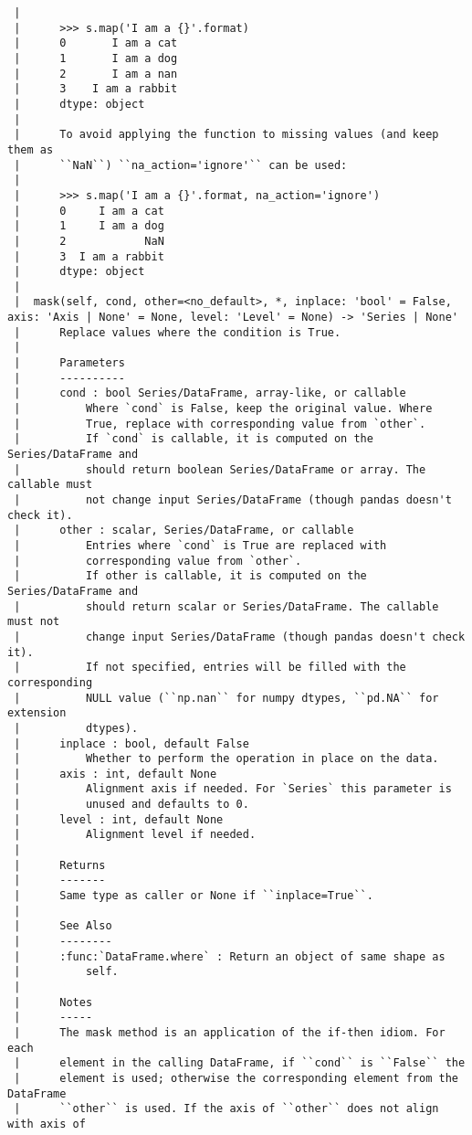 \documentclass[
  letterpaper,
  DIV=11,
  numbers=noendperiod]{scrreprt}
\begin{document}
\begin{verbatim}
 |      
 |      >>> s.map('I am a {}'.format)
 |      0       I am a cat
 |      1       I am a dog
 |      2       I am a nan
 |      3    I am a rabbit
 |      dtype: object
 |      
 |      To avoid applying the function to missing values (and keep them as
 |      ``NaN``) ``na_action='ignore'`` can be used:
 |      
 |      >>> s.map('I am a {}'.format, na_action='ignore')
 |      0     I am a cat
 |      1     I am a dog
 |      2            NaN
 |      3  I am a rabbit
 |      dtype: object
 |  
 |  mask(self, cond, other=<no_default>, *, inplace: 'bool' = False, axis: 'Axis | None' = None, level: 'Level' = None) -> 'Series | None'
 |      Replace values where the condition is True.
 |      
 |      Parameters
 |      ----------
 |      cond : bool Series/DataFrame, array-like, or callable
 |          Where `cond` is False, keep the original value. Where
 |          True, replace with corresponding value from `other`.
 |          If `cond` is callable, it is computed on the Series/DataFrame and
 |          should return boolean Series/DataFrame or array. The callable must
 |          not change input Series/DataFrame (though pandas doesn't check it).
 |      other : scalar, Series/DataFrame, or callable
 |          Entries where `cond` is True are replaced with
 |          corresponding value from `other`.
 |          If other is callable, it is computed on the Series/DataFrame and
 |          should return scalar or Series/DataFrame. The callable must not
 |          change input Series/DataFrame (though pandas doesn't check it).
 |          If not specified, entries will be filled with the corresponding
 |          NULL value (``np.nan`` for numpy dtypes, ``pd.NA`` for extension
 |          dtypes).
 |      inplace : bool, default False
 |          Whether to perform the operation in place on the data.
 |      axis : int, default None
 |          Alignment axis if needed. For `Series` this parameter is
 |          unused and defaults to 0.
 |      level : int, default None
 |          Alignment level if needed.
 |      
 |      Returns
 |      -------
 |      Same type as caller or None if ``inplace=True``.
 |      
 |      See Also
 |      --------
 |      :func:`DataFrame.where` : Return an object of same shape as
 |          self.
 |      
 |      Notes
 |      -----
 |      The mask method is an application of the if-then idiom. For each
 |      element in the calling DataFrame, if ``cond`` is ``False`` the
 |      element is used; otherwise the corresponding element from the DataFrame
 |      ``other`` is used. If the axis of ``other`` does not align with axis of

\end{verbatim}
\end{document}
